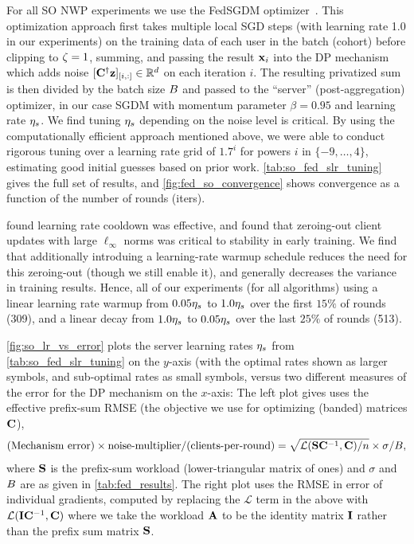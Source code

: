 \documentclass{article}
\begin{document}
 For all SO NWP experiments we use the FedSGDM optimizer~\citep{reddi20adaptive}. This optimization approach first takes multiple local SGD steps (with learning rate 1.0 in our experiments) on the training data of each user in the batch (cohort) before clipping to $\zeta=1$, summing, and passing the result $\mathbf{x}_i$ into the DP mechanism which adds noise $[\mathbf{C}^\dagger \mathbf{z}]_{[i, :]} \in \mathbb{R}^d$ on each iteration $i$. The resulting privatized sum is then divided by the batch size $B$ and passed to the ``server'' (post-aggregation) optimizer, in our case SGDM with momentum parameter $\beta=0.95$ and learning rate $\eta_s$.  We find tuning $\eta_s$ depending on the noise level is critical.  By using the computationally efficient approach mentioned above, we were able to conduct rigorous tuning over a learning rate grid of $1.7^i$ for powers $i$ in $\{-9, \dots, 4\}$, estimating good initial guesses based on prior work.  \cref{tab:so_fed_slr_tuning} gives the full set of results, and \cref{fig:fed_so_convergence} shows convergence as a function of the number of rounds (iters).

 \citet{denisov22matfact} found learning rate cooldown was effective, and \citet{choquette2022multi} found that zeroing-out client updates with large $\ell_\infty$ norms was critical to stability in early training. We find that additionally introduing a learning-rate warmup schedule reduces the need for this zeroing-out (though we still enable it), and generally decreases the variance in training results.  Hence, all of our experiments (for all algorithms) using a linear learning rate warmup from $0.05\eta_s$ to $1.0\eta_s$ over the first $15\%$ of rounds (309), and a linear decay from $1.0\eta_s$ to $0.05\eta_s$ over the last $25\%$ of rounds (513).

\newcommand{\efferr}{L_{e}}
\cref{fig:so_lr_vs_error} plots the server learning rates $\eta_s$ from \cref{tab:so_fed_slr_tuning} on the $y$-axis (with the optimal rates shown as larger symbols, and sub-optimal rates as small symbols, versus two different measures of the error for the DP mechanism on the $x$-axis: The left plot gives uses the effective prefix-sum RMSE (the objective we use for optimizing (banded) matrices $\mathbf{C}$),
\begin{equation}\label{eq:effnoise}
  \text{(Mechanism error)} \times \text{noise-multiplier} / \text{(clients-per-round)} \\
        = \sqrt{\mathcal{L}(\mathbf{S}\mathbf{C}^{-1}, \mathbf{C})/n} \times \sigma / B,
\end{equation}
where $\mathbf{S}$ is the prefix-sum workload (lower-triangular matrix of ones) and $\sigma$ and $B$ are as given in \cref{tab:fed_results}. The right plot uses the RMSE in error of individual gradients, computed by replacing the $\mathcal{L}$ term in the above with $\mathcal{L}(\mathbf{I}\mathbf{C}^{-1}, \mathbf{C})$ where we take the workload $\mathbf{A}$ to be the identity matrix $\mathbf{I}$ rather than the prefix sum matrix $\mathbf{S}$.
\end{document}
